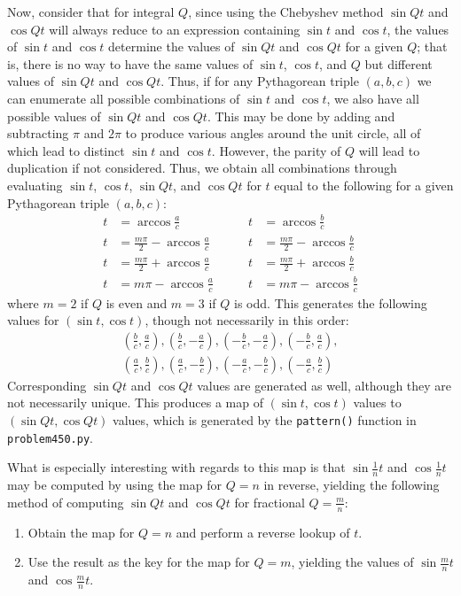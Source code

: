 \documentclass[12pt]{article}
\begin{document}
Now, consider that for integral $Q$, since using the Chebyshev method $\sin Qt$ and $\cos Qt$ will always reduce to an expression containing $\sin t$ and $\cos t$, the values of $\sin t$ and $\cos t$ determine the values of $\sin Qt$ and $\cos Qt$ for a given $Q$; that is, there is no way to have the same values of $\sin t$, $\cos t$, and $Q$ but different values of $\sin Qt$ and $\cos Qt$. Thus, if for any Pythagorean triple $(a, b, c)$ we can enumerate all possible combinations of $\sin t$ and $\cos t$, we also have all possible values of $\sin Qt$ and $\cos Qt$. This may be done by adding and subtracting $\pi$ and $2\pi$ to produce various angles around the unit circle, all of which lead to distinct $\sin t$ and $\cos t$. However, the parity of $Q$ will lead to duplication if not considered. Thus, we obtain all combinations through evaluating $\sin t$, $\cos t$, $\sin Qt$, and $\cos Qt$ for $t$ equal to the following for a given Pythagorean triple $(a, b, c)$:
\begin{align*}
  t &= \arccos\frac{a}{c} &\qquad t &= \arccos \frac{b}{c} \\
  t &= \frac{m\pi}{2} - \arccos\frac{a}{c} &\qquad t &= \frac{m\pi}{2} - \arccos\frac{b}{c} \\
  t &= \frac{m\pi}{2} + \arccos\frac{a}{c} &\qquad t &= \frac{m\pi}{2} + \arccos\frac{b}{c} \\
  t &= m\pi - \arccos\frac{a}{c} &\qquad t &= m\pi - \arccos\frac{b}{c}
\end{align*}
where $m = 2$ if $Q$ is even and $m = 3$ if $Q$ is odd. This generates the following values for $(\sin t, \cos t)$, though not necessarily in this order:
\begin{align*}
  \left( \frac{b}{c}, \frac{a}{c} \right), \left( \frac{b}{c}, -\frac{a}{c} \right), \left( -\frac{b}{c}, -\frac{a}{c} \right), \left( -\frac{b}{c}, \frac{a}{c} \right), \\
  \left( \frac{a}{c}, \frac{b}{c} \right), \left( \frac{a}{c}, -\frac{b}{c} \right), \left( -\frac{a}{c}, -\frac{b}{c} \right), \left( -\frac{a}{c}, \frac{b}{c} \right)
\end{align*}
Corresponding $\sin Qt$ and $\cos Qt$ values are generated as well, although they are not necessarily unique. This produces a map of $(\sin t, \cos t)$ values to $(\sin Qt, \cos Qt)$ values, which is generated by the \texttt{pattern()} function in \texttt{problem450.py}.

What is especially interesting with regards to this map is that $\sin\frac{1}{n}t$ and $\cos\frac{1}{n}t$ may be computed by using the map for $Q = n$ in reverse, yielding the following method of computing $\sin Qt$ and $\cos Qt$ for fractional $Q = \frac{m}{n}$:
\begin{enumerate}
  \item Obtain the map for $Q = n$ and perform a reverse lookup of $t$.
  \item Use the result as the key for the map for $Q = m$, yielding the values of $\sin \frac{m}{n}t$ and $\cos \frac{m}{n}t$.
\end{enumerate}
\end{document}
